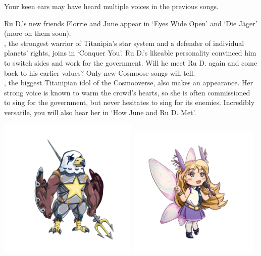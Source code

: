 
Your keen ears may have heard multiple voices in the previous songs.

Ru D.'s new friends Florrie and June appear in `Eyes Wide Open' and `Die Jäger' (more on them soon).\\

, the strongest warrior of Titanipia's star system and a defender of individual planets' rights, joins in `Conquer You'. Ru D.'s likeable personality convinced him to switch sides and work for the government. Will he meet Ru D. again and come back to his earlier values? Only new Cosmoose songs will tell.\\

, the biggest Titanipian idol of the Cosmooverse, also makes an appearance. Her strong voice is known to warm the crowd's hearts, so she is often commissioned to sing for the government, but never hesitates to sing for its enemies. Incredibly versatile, you will also hear her in `How June and Ru D. Met'.\\

\begin{center}
\includegraphics[width=0.50\textwidth]{Assets/starsmash}
\includegraphics[width=0.47\textwidth]{Assets/camo}
\end{center}

